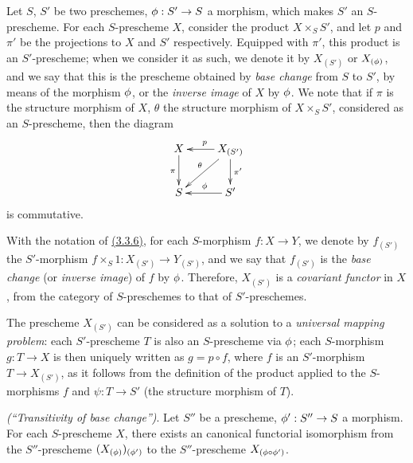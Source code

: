 \begin{env}[3.3.6]
\label{env-1.3.3.6}
Let $S$, $S'$ be two preschemes, $\phi:S'\to S$ a morphism, which makes $S'$ an
$S$-prescheme. For each $S$-prescheme $X$, consider the product $X\times_S S'$,
and let $p$ and $\pi'$ be the projections to $X$ and $S'$ respectively. Equipped
with $\pi'$, this product is an $S'$-prescheme; when we consider it as such, we
denote it by $X_{(S')}$ or $X_{(\phi)}$, and we say that this is the prescheme
obtained by {\it base change} from $S$ to $S'$, by means of the morphism
$\phi$, or the {\it inverse image} of $X$ by $\phi$. We note that if $\pi$ is
the structure morphism of $X$, $\theta$ the structure morphism of
$X\times_S S'$, considered as an $S$-prescheme, then the diagram
\[
  \xymatrix{
    X\ar[d]_\pi &
    X_{(S')}\ar[l]_p\ar[ld]_\theta\ar[d]^{\pi'}\\
    S &
    S'\ar[l]_\vphi
  }
\]
is commutative.
\end{env}

\begin{env}[3.3.7]
\label{env-1.3.3.7}
With the notation of \hyperref[env-1.3.3.6]{(3.3.6)}, for each $S$-morphism $f:X\to Y$, we
denote by $f_{(S')}$ the $S'$-morphism $f\times_S 1:X_{(S')}\to Y_{(S')}$, and
we say that $f_{(S')}$ is the {\it base change} (or {\it inverse image}) of
$f$ by $\phi$. Therefore, $X_{(S')}$ is a {\it covariant functor} in $X$, from
the category of $S$-preschemes to that of $S'$-preschemes.
\end{env}

\begin{env}[3.3.8]
\label{env-1.3.3.8}
The prescheme $X_{(S')}$ can be considered as a solution to a {\it universal
mapping problem}: each $S'$-prescheme $T$ is also an $S$-prescheme via $\phi$;
each $S$-morphism $g:T\to X$ is then uniquely written as $g=p\circ f$, where $f$
is an $S'$-morphism $T\to X_{(S')}$, as it follows from the definition of the
product applied to the $S$-morphisms $f$ and $\psi:T\to S'$ (the structure
morphism of $T$).
\end{env}

\begin{prop}[3.3.9]
\label{prop-1.3.3.9}
{\it (``Transitivity of base change'')}. Let $S''$ be a prescheme,
$\phi':S''\to S$ a morphism. For each $S$-prescheme $X$, there exists an
canonical functorial isomorphism from the $S''$-prescheme
$(X_{(\phi)})_{(\phi')}$ to the $S''$-prescheme $X_{(\phi\circ\phi')}$.
\end{prop}

